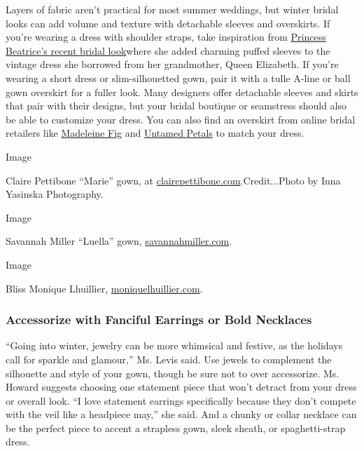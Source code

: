 Layers of fabric aren't practical for most summer weddings, but winter
bridal looks can add volume and texture with detachable sleeves and
overskirts. If you're wearing a dress with shoulder straps, take
inspiration from
\href{https://www.vogue.com/article/11-things-we-know-about-princess-beatrice-royal-wedding}{Princess
Beatrice's recent bridal look}where she added charming puffed sleeves to
the vintage dress she borrowed from her grandmother, Queen Elizabeth. If
you're wearing a short dress or slim-silhouetted gown, pair it with a
tulle A-line or ball gown overskirt for a fuller look. Many designers
offer detachable sleeves and skirts that pair with their designs, but
your bridal boutique or seamstress should also be able to customize your
dress. You can also find an overskirt from online bridal retailers like
\href{https://www.madeleinefig.com/copy-of-belts-sashes}{Madeleine Fig}
and
\href{https://untamedpetals.com/search?type=product\&q=overskirt}{Untamed
Petals} to match your dress.

Image

Claire Pettibone ``Marie'' gown, at
\href{https://clairepettibone.com/products/marie-gown}{clairepettibone.com}.Credit...Photo
by Inna Yasinska Photography.

Image

Savannah Miller ``Luella'' gown,
\href{https://www.savannahmiller.com/aurora/luella}{savannahmiller.com}.

Image

Bliss Monique Lhuillier,
\href{https://moniquelhuillier.com/apps/lookbook/bliss-fall-2020}{moniquelhuillier.com}.

\hypertarget{accessorize-with-fanciful-earrings-or-bold-necklaces}{%
\subsubsection{\texorpdfstring{\textbf{Accessorize with Fanciful
Earrings or Bold
Necklaces}}{Accessorize with Fanciful Earrings or Bold Necklaces}}\label{accessorize-with-fanciful-earrings-or-bold-necklaces}}

``Going into winter, jewelry can be more whimsical and festive, as the
holidays call for sparkle and glamour,'' Ms. Levis said. Use jewels to
complement the silhouette and style of your gown, though be sure not to
over accessorize. Ms. Howard suggests choosing one statement piece that
won't detract from your dress or overall look. ``I love statement
earrings specifically because they don't compete with the veil like a
headpiece may,'' she said. And a chunky or collar necklace can be the
perfect piece to accent a strapless gown, sleek sheath, or
spaghetti-strap dress.

